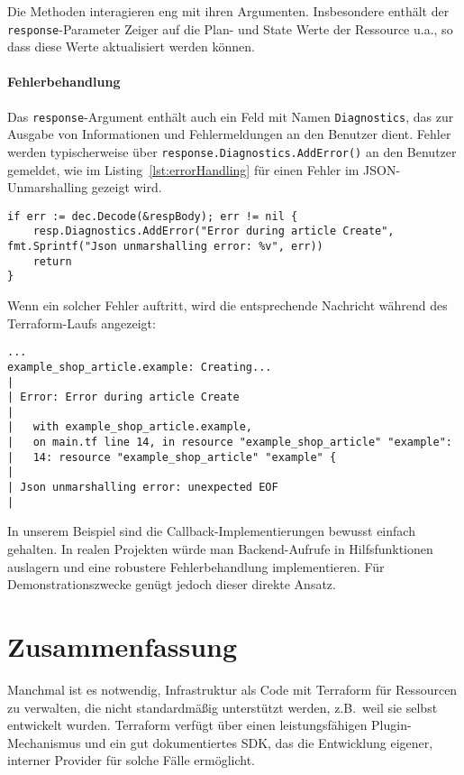 \documentclass[paper=a4,11pt,numbers=noenddot]{article}
\begin{document}
Die Methoden interagieren eng mit ihren Argumenten. Insbesondere enthält der \verb'response'-Parameter Zeiger auf die Plan- und State Werte der Ressource u.a., so dass diese Werte aktualisiert werden können.

\paragraph{Fehlerbehandlung}

Das \verb'response'-Argument enthält auch ein Feld mit Namen \verb'Diagnostics', das zur Ausgabe von Informationen und Fehlermeldungen an den Benutzer dient. Fehler werden typischerweise über \verb'response.Diagnostics.AddError()' an den Benutzer gemeldet, wie im Listing~\ref{lst:errorHandling} für einen Fehler im JSON-Unmarshalling gezeigt wird.

\begin{lstlisting}[label=lst:errorHandling]
if err := dec.Decode(&respBody); err != nil {
    resp.Diagnostics.AddError("Error during article Create", fmt.Sprintf("Json unmarshalling error: %v", err))
    return
}
\end{lstlisting}

Wenn ein solcher Fehler auftritt, wird die entsprechende Nachricht während des Terraform-Laufs angezeigt:

\begin{lstlisting}
...
example_shop_article.example: Creating...
|
| Error: Error during article Create
|
|   with example_shop_article.example,
|   on main.tf line 14, in resource "example_shop_article" "example":
|   14: resource "example_shop_article" "example" {
|
| Json unmarshalling error: unexpected EOF
|
\end{lstlisting}

In unserem Beispiel sind die Callback-Implementierungen bewusst einfach gehalten. In realen Projekten würde man Backend-Aufrufe in Hilfsfunktionen auslagern und eine robustere Fehlerbehandlung implementieren. Für Demonstrationszwecke genügt jedoch dieser direkte Ansatz.

\section{Zusammenfassung}
\label{sec:summary}

Manchmal ist es notwendig, Infrastruktur als Code mit Terraform für Ressourcen zu verwalten, die nicht standardmäßig unterstützt werden, z.B.\ weil sie selbst entwickelt wurden. Terraform verfügt über einen leistungsfähigen Plugin-Mechanismus und ein gut dokumentiertes SDK, das die Entwicklung eigener, interner Provider für solche Fälle ermöglicht.
\end{document}
